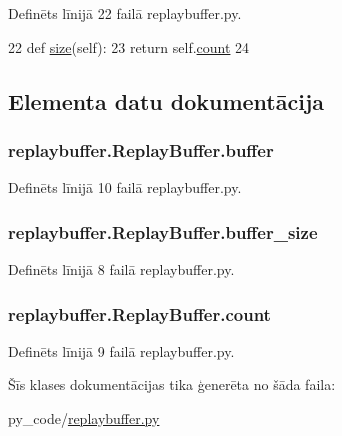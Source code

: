 Definēts līnijā 22 failā replaybuffer.\+py.


\begin{DoxyCode}
22     \textcolor{keyword}{def }\hyperlink{classreplaybuffer_1_1_replay_buffer_a88315be96866304cdd1d3ac57e7ffebb}{size}(self):
23         \textcolor{keywordflow}{return} self.\hyperlink{classreplaybuffer_1_1_replay_buffer_a9a4f50b29294de06ab6f42b0403b7e1e}{count}
24 
\end{DoxyCode}


\subsection{Elementa datu dokumentācija}
\subsubsection[{\texorpdfstring{buffer}{buffer}}]{\setlength{\rightskip}{0pt plus 5cm}replaybuffer.\+Replay\+Buffer.\+buffer}\hypertarget{classreplaybuffer_1_1_replay_buffer_ae1fc312917fad747d402f0f103e20061}{}\label{classreplaybuffer_1_1_replay_buffer_ae1fc312917fad747d402f0f103e20061}


Definēts līnijā 10 failā replaybuffer.\+py.

\subsubsection[{\texorpdfstring{buffer\+\_\+size}{buffer_size}}]{\setlength{\rightskip}{0pt plus 5cm}replaybuffer.\+Replay\+Buffer.\+buffer\+\_\+size}\hypertarget{classreplaybuffer_1_1_replay_buffer_a86681e04166a4ee274542f57ddd1a12b}{}\label{classreplaybuffer_1_1_replay_buffer_a86681e04166a4ee274542f57ddd1a12b}


Definēts līnijā 8 failā replaybuffer.\+py.

\subsubsection[{\texorpdfstring{count}{count}}]{\setlength{\rightskip}{0pt plus 5cm}replaybuffer.\+Replay\+Buffer.\+count}\hypertarget{classreplaybuffer_1_1_replay_buffer_a9a4f50b29294de06ab6f42b0403b7e1e}{}\label{classreplaybuffer_1_1_replay_buffer_a9a4f50b29294de06ab6f42b0403b7e1e}


Definēts līnijā 9 failā replaybuffer.\+py.



Šīs klases dokumentācijas tika ģenerēta no šāda faila\+:\begin{DoxyCompactItemize}
\item 
py\+\_\+code/\hyperlink{replaybuffer_8py}{replaybuffer.\+py}\end{DoxyCompactItemize}
